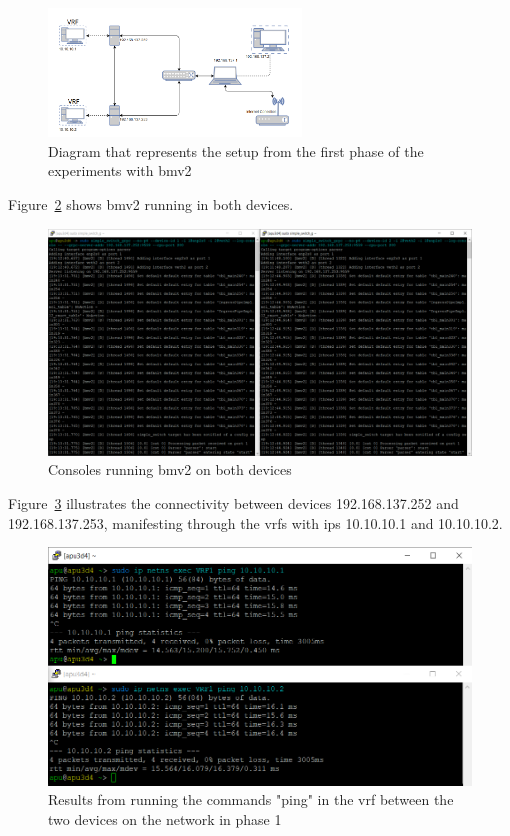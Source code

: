 \begin{figure}
	\centering
	\includegraphics[width=0.6\textwidth]{Chapters/Figures/tests/bmv2_phase_1/setup_diagram.PNG}
	\caption{Diagram that represents the setup from the first phase of the experiments with \gls{bmv2}}
	\label{fig:exp2_phase1_diagram}
\end{figure}


Figure~\ref{fig:exp2_phase1_bmv2} shows \gls{bmv2} running in both devices.

\begin{figure}
	\centering
	\includegraphics[width=\textwidth]{Chapters/Figures/tests/bmv2_phase_1/bmv2_running.PNG}
	\caption{Consoles running \gls{bmv2} on both devices}
	\label{fig:exp2_phase1_bmv2}
\end{figure}

Figure~\ref{fig:exp2_phase1_pings} illustrates the connectivity between devices 192.168.137.252 and 192.168.137.253, manifesting through the \glspl{vrf} with \glspl{ip} 10.10.10.1 and 10.10.10.2.

\begin{figure}
	\centering
	\includegraphics[width=\textwidth]{Chapters/Figures/tests/bmv2_phase_1/pings-2.PNG}
	\caption{Results from running the commands "ping" in the \gls{vrf} between the two devices on the network in phase 1}
	\label{fig:exp2_phase1_pings}
\end{figure}


